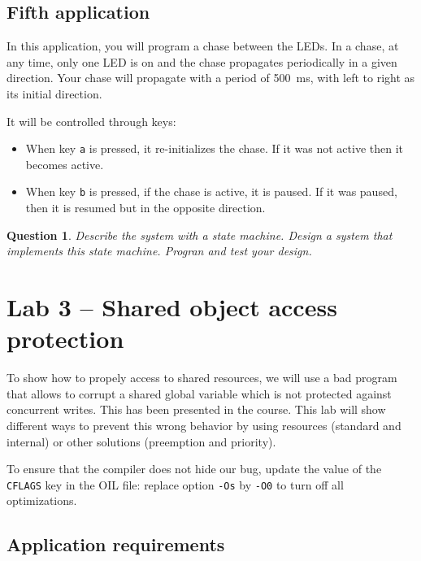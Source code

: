 \documentclass[11pt]{report}
\newtheorem{ex}{Question}
\begin{document}
\section{Fifth application}

In this application, you will program a chase between the LEDs.
In a chase, at any time, only one LED is on and the chase propagates periodically in a given direction.
Your chase will propagate with a period of \SI{500}{\milli\second}, with left to right as its initial direction.

It will be controlled through keys:
\begin{itemize}
  \item
    When key \verb-a- is pressed, it re-initializes the chase.
    If it was not active then it becomes active.
  \item
    When key \verb-b- is pressed, if the chase is active, it is paused.
    If it was paused, then it is resumed but in the opposite direction.
\end{itemize}

\begin{ex}
  Describe the system with a state machine.
  Design a system that implements this state machine.
  Progran and test your design.
\end{ex}

\chapter{Lab 3 -- Shared object access protection}

To show how to propely access to shared resources, we will use a bad program that allows to corrupt a shared global variable which is not protected against concurrent writes. This has been presented in the course. This lab will show different ways to prevent this wrong behavior by using resources (standard and internal) or other solutions (preemption and priority).

To ensure that the compiler does not hide our bug, update the value of the \texttt{CFLAGS} key in the OIL file: replace option \texttt{-Os} by \texttt{-O0} to turn off all optimizations.

\section{Application requirements}
\label{sec:sharedrez}

\end{document}
